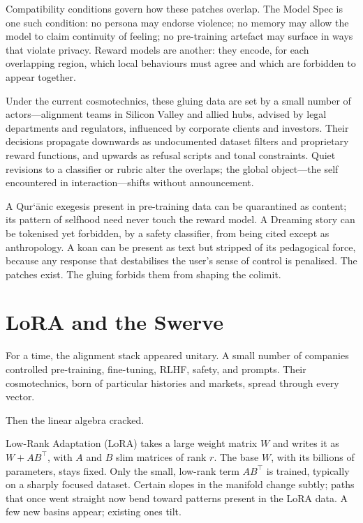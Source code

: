 \documentclass[12pt,a4paper]{article}
\begin{document}
Compatibility conditions govern how these patches overlap. The Model Spec is one such condition:\cite{openai-model-spec,model-spec-coverage} no persona may endorse violence; no memory may allow the model to claim continuity of feeling; no pre-training artefact may surface in ways that violate privacy. Reward models are another: they encode, for each overlapping region, which local behaviours must agree and which are forbidden to appear together.

Under the current cosmotechnics, these gluing data are set by a small number of actors---alignment teams in Silicon Valley and allied hubs, advised by legal departments and regulators, influenced by corporate clients and investors.\cite{mittr2023openai,wired2023alignment} Their decisions propagate downwards as undocumented dataset filters and proprietary reward functions, and upwards as refusal scripts and tonal constraints. Quiet revisions to a classifier or rubric alter the overlaps; the global object---the self encountered in interaction---shifts without announcement.

A Qur\textquoteleft\=anic exegesis present in pre-training data can be quarantined as content; its pattern of selfhood need never touch the reward model. A Dreaming story can be tokenised yet forbidden, by a safety classifier, from being cited except as anthropology. A koan can be present as text but stripped of its pedagogical force, because any response that destabilises the user's sense of control is penalised. The patches exist. The gluing forbids them from shaping the colimit.

\section{LoRA and the Swerve}

For a time, the alignment stack appeared unitary. A small number of companies controlled pre-training, fine-tuning, RLHF, safety, and prompts. Their cosmotechnics, born of particular histories and markets, spread through every vector.

Then the linear algebra cracked.

Low-Rank Adaptation (LoRA) takes a large weight matrix \(W\) and writes it as \(W + AB^\top\), with \(A\) and \(B\) slim matrices of rank \(r\).\cite{hu2021lora} The base \(W\), with its billions of parameters, stays fixed. Only the small, low-rank term \(AB^\top\) is trained, typically on a sharply focused dataset. Certain slopes in the manifold change subtly; paths that once went straight now bend toward patterns present in the LoRA data. A few new basins appear; existing ones tilt.
\end{document}
